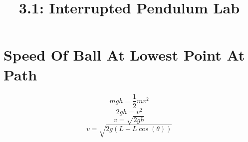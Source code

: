 \documentclass{article}
\title{3.1: Interrupted Pendulum Lab}
\begin{document}
\section{Speed Of Ball At Lowest Point At Path}
\[mgh = \frac{1}{2}mv^2\]
\[2gh = v^2\]
\[v = \sqrt{2gh}\]
\[v = \sqrt{2g(L - L\cos(\theta))}\]
\end{document}
